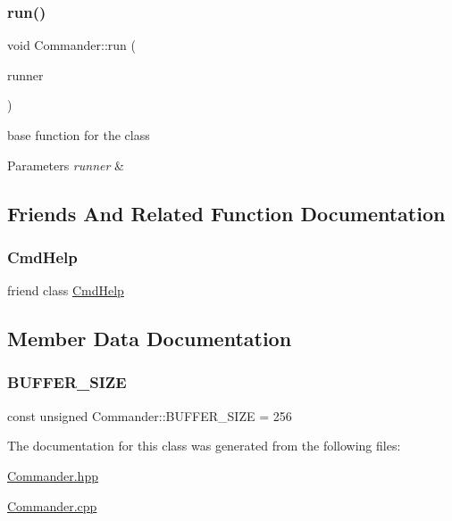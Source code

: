 \subsubsection{\texorpdfstring{run()}{run()}}
{\footnotesize\ttfamily void Commander\+::run (\begin{DoxyParamCaption}\item[{\hyperlink{Command_8hpp_ad45c3de597c2023a8be0399d914161f4}{Runner\+Type} \&}]{runner }\end{DoxyParamCaption})\hspace{0.3cm}{\ttfamily [static]}}

base function for the class 
\begin{DoxyParams}{Parameters}
{\em runner} & \\
\hline
\end{DoxyParams}


\subsection{Friends And Related Function Documentation}
\mbox{\label{classCommander_aaf5700242631ebac67a8b2f6eaf9c730}} 
\subsubsection{\texorpdfstring{Cmd\+Help}{CmdHelp}}
{\footnotesize\ttfamily friend class \hyperlink{classCmdHelp}{Cmd\+Help}\hspace{0.3cm}{\ttfamily [friend]}}



\subsection{Member Data Documentation}
\mbox{\label{classCommander_a9e1b32d844b2d8080e51c4e8a4ca0442}} 
\subsubsection{\texorpdfstring{B\+U\+F\+F\+E\+R\+\_\+\+S\+I\+ZE}{BUFFER\_SIZE}}
{\footnotesize\ttfamily const unsigned Commander\+::\+B\+U\+F\+F\+E\+R\+\_\+\+S\+I\+ZE = 256\hspace{0.3cm}{\ttfamily [static]}}



The documentation for this class was generated from the following files\+:\begin{DoxyCompactItemize}
\item 
\hyperlink{Commander_8hpp}{Commander.\+hpp}\item 
\hyperlink{Commander_8cpp}{Commander.\+cpp}\end{DoxyCompactItemize}
